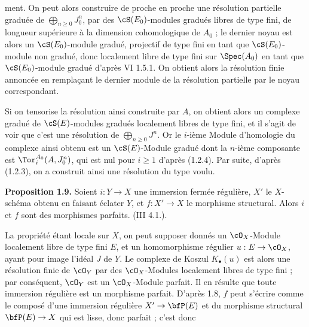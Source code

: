 ment. On peut alors construire de proche en proche une résolution partielle graduée de \(\bigoplus_{n\ge0}J_0^n\), par des \(\cS(E_0)\)-modules gradués libres de type fini, de longueur supérieure à la dimension cohomologique de \(A_0\) ; le dernier noyau est alors un \(\cS(E_0)\)-module gradué, projectif de type fini en tant que \(\cS(E_0)\)-module non gradué, donc localement libre de type fini sur \(\Spec(A_0)\) en tant que \(\cS(E_0)\)-module gradué d'après VI 1.5.1. On obtient alors la résolution finie annoncée en remplaçant le dernier module de la résolution partielle par le noyau correspondant.

Si on tensorise la résolution ainsi construite par \(A\), on obtient alors un complexe gradué de \(\cS(E)\)-modules gradués localement libres de type fini, et il s'agit de voir que c'est une résolution de \(\bigoplus_{n\ge0}J^n\). Or le \(i\)-ième Module d'homologie du complexe ainsi obtenu est un \(\cS(E)\)-Module gradué dont la \(n\)-ième composante est \(\Tor_i^{A_0}(A,J_0^n)\), qui est nul pour \(i\ge1\) d'après (1.2.4). Par suite, d'après (1.2.3), on a construit ainsi une résolution du type voulu.

\textbf{Proposition 1.9.} Soient \(i:Y\to X\) une immersion fermée régulière, \(X'\) le \(X\)-schéma obtenu en faisant éclater \(Y\), et \(f:X'\to X\) le morphisme structural. Alors \(i\) et \(f\) sont des morphismes parfaits. (III 4.1.).

La propriété étant locale sur \(X\), on peut supposer donnés un \(\cO_X\)-Module localement libre de type fini \(E\), et un homomorphisme régulier \(u:E\to\cO_X\), ayant pour image l'idéal \(J\) de \(Y\). Le complexe de Koszul \(K_\bullet(u)\) est alors une résolution finie de \(\cO_Y\) par des \(\cO_X\)-Modules localement libres de type fini ; par conséquent, \(\cO_Y\) est un \(\cO_X\)-Module parfait. Il en résulte que toute immersion régulière est un morphisme parfait. D'après 1.8, \(f\) peut s'écrire comme le composé d'une immersion régulière \(X'\to\bfP(E)\) et du morphisme structural \(\bfP(E)\to X\) qui est lisse, donc parfait ; c'est donc
